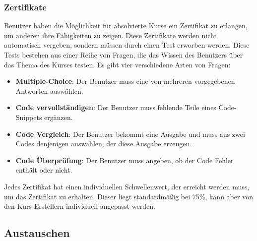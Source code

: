 \documentclass[main.tex]{subfiles}
\begin{document}
    \subsubsection{Zertifikate}
    Benutzer haben die Möglichkeit für absolvierte Kurse ein Zertifikat zu erlangen, um anderen ihre Fähigkeiten zu zeigen.
    Diese Zertifikate werden nicht automatisch vergeben, sondern müssen durch einen Test erworben werden.
    Diese Tests bestehen aus einer Reihe von Fragen, die das Wissen des Benutzers über das Thema des Kurses testen.
    Es gibt vier verschiedene Arten von Fragen:
    \begin{itemize}
        \item \textbf{Multiple-Choice}: Der Benutzer muss eine von mehreren vorgegebenen Antworten auswählen.
        \item \textbf{Code vervollständigen}: Der Benutzer muss fehlende Teile eines Code-Snippets ergänzen.
        \item \textbf{Code Vergleich}: Der Benutzer bekommt eine Ausgabe und muss aus zwei Codes denjenigen auswählen, der diese Ausgabe erzeugen.
        \item \textbf{Code Überprüfung}: Der Benutzer muss angeben, ob der Code Fehler enthält oder nicht.
    \end{itemize}
    Jedes Zertifikat hat einen individuellen Schwellenwert, der erreicht werden muss, um das Zertifikat zu erhalten.
    Dieser liegt standardmäßig bei 75\%, kann aber von den Kurs-Erstellern individuell angepasst werden.
    \subsection{Austauschen}
\end{document}
